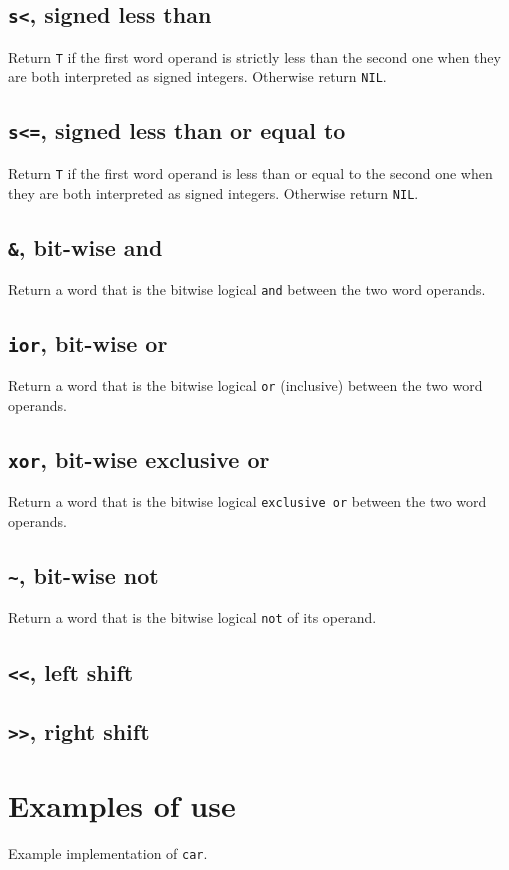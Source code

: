 \subsection{\texttt{s<}, signed less than}

Return \texttt{T} if the first word operand is strictly less than the
second one when they are both interpreted as signed integers.
Otherwise return \texttt{NIL}.

\subsection{\texttt{s<=}, signed less than or equal to}

Return \texttt{T} if the first word operand is less than or equal to
the second one when they are both interpreted as signed integers.
Otherwise return \texttt{NIL}.

\subsection{\texttt{\&}, bit-wise and}

Return a word that is the bitwise logical \texttt{and} between the two
word operands. 

\subsection{\texttt{ior}, bit-wise or}

Return a word that is the bitwise logical \texttt{or} (inclusive)
between the two word operands.

\subsection{\texttt{xor}, bit-wise exclusive or}

Return a word that is the bitwise logical \texttt{exclusive or}
between the two word operands.

\subsection{\texttt{\~}, bit-wise not}

Return a word that is the bitwise logical \texttt{not} of its operand.

\subsection{\texttt{<\thinspace <}, left shift}


\subsection{\texttt{>\thinspace >}, right shift}

\section{Examples of use}

\begin{codefragment}
\caption{\label{code-car-1}
Example implementation of \texttt{car}.}
\end{codefragment}
